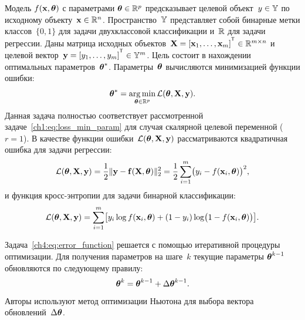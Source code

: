 \documentclass[11pt, a5paper]{dissert}
\begin{document}
Модель $f( \mathbf{x}, \boldsymbol{\theta})$ с параметрами $\boldsymbol{\theta} \in \mathbb{R}^p$ предсказывает целевой объект~$y \in \mathbb{Y}$ по исходному объекту~$\mathbf{x} \in \mathbb{R}^{n}$. Пространство~$\mathbb{Y}$ представляет собой бинарные метки классов~$\{0, 1\}$ для задачи двухклассовой классификации и~$\mathbb{R}$ для задачи регрессии.
Даны матрица исходных объектов~$\bX = [\bx_1, \dots, \bx_m]^{\T} \in \bbR^{m \times n}$ и целевой вектор~$\by = [y_1, \dots, y_m]^{\T} \in \bbY^{m}$. 
Цель состоит в нахождении оптимальных параметров~$\boldsymbol{\theta}^*$.
Параметры~$\boldsymbol{\theta}$ вычисляются минимизацией функции ошибки:
\begin{equation}
	\boldsymbol{\theta}^* = \mathop{\arg \min}\limits_{\boldsymbol{\theta} \in \mathbb{R}^p} \mathcal{L}(\boldsymbol{\theta}, \mathbf{X}, \mathbf{y}).
	\label{ch4:eq:error_function}
\end{equation}
Данная задача полностью соответствует рассмотренной задаче~\eqref{ch1:eq:loss_min_param} для случая скалярной целевой переменной ($r=1$).
В качестве функции ошибки~$\mathcal{L} (\boldsymbol{\theta}, \mathbf{X}, \mathbf{y})$ рассматриваются квадратичная ошибка для задачи регрессии:
\begin{equation}
	\mathcal{L}(\boldsymbol{\theta}, \mathbf{X}, \mathbf{y}) = \frac 12 \| \mathbf{y} - \mathbf{f}(\mathbf{X}, \boldsymbol{\theta}) \|_2^2 = \frac 12 \sum_{i=1}^m \bigl( y_i - f(\mathbf{x}_i,  \boldsymbol{\theta})\bigr)^2,
	\label{ch4:eq:squared_error}
\end{equation}
и функция кросс-энтропии для задачи бинарной классификации: 
\begin{equation}
	\mathcal{L}(\boldsymbol{\theta}, \mathbf{X}, \mathbf{y}) = \sum_{i=1}^m \bigl[y_i \log f (\mathbf{x}_i , \boldsymbol{\theta}) + (1-y_i) \log \bigl(1 - f (\mathbf{x}_i , \boldsymbol{\theta})\bigr)\bigr].
	\label{ch4:eq:log_loss}
\end{equation}

Задача~\eqref{ch4:eq:error_function} решается с помощью итеративной процедуры оптимизации. 
Для получения параметров на шаге~$k$ текущие параметры $\boldsymbol{\theta}^{k-1}$ обновляются по следующему правилу:
\begin{equation}
	\boldsymbol{\theta}^k = \boldsymbol{\theta}^{k - 1} + \Delta \boldsymbol{\theta}^{k - 1}.
	\label{ch4:eq:update_rule}
\end{equation}
Авторы используют метод оптимизации Ньютона для выбора вектора обновлений~$\Delta \boldsymbol{\theta}$.
\end{document}
